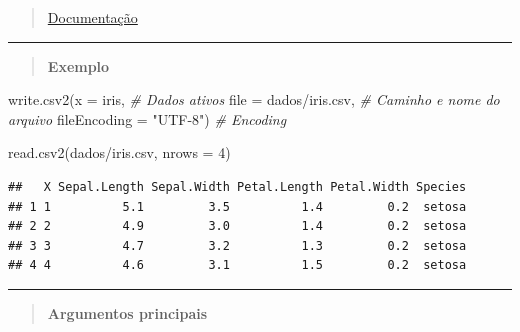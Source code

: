 \documentclass[
]{book}
\newenvironment{Shaded}{\begin{snugshade}}{\end{snugshade}}
\newcommand{\AttributeTok}[1]{\textcolor[rgb]{0.77,0.63,0.00}{#1}}
\newcommand{\CommentTok}[1]{\textcolor[rgb]{0.56,0.35,0.01}{\textit{#1}}}
\newcommand{\DecValTok}[1]{\textcolor[rgb]{0.00,0.00,0.81}{#1}}
\newcommand{\FunctionTok}[1]{\textcolor[rgb]{0.00,0.00,0.00}{#1}}
\newcommand{\NormalTok}[1]{#1}
\newcommand{\StringTok}[1]{\textcolor[rgb]{0.31,0.60,0.02}{#1}}
\theoremstyle{definition}
\theoremstyle{definition}
\theoremstyle{definition}
\theoremstyle{definition}
\theoremstyle{remark}
\begin{document}
\begin{quote}
\href{https://www.rdocumentation.org/packages/utils/versions/3.6.2/topics/write.table}{Documentação}
\end{quote}

\begin{center}\rule{0.5\linewidth}{0.5pt}\end{center}

\begin{quote}
\textbf{Exemplo}
\end{quote}

\begin{Shaded}
\begin{Highlighting}[]
\FunctionTok{write.csv2}\NormalTok{(}\AttributeTok{x =}\NormalTok{ iris,                }\CommentTok{\# Dados ativos}
           \AttributeTok{file =} \StringTok{\textquotesingle{}dados/iris.csv\textquotesingle{}}\NormalTok{, }\CommentTok{\# Caminho e nome do arquivo}
           \AttributeTok{fileEncoding =} \StringTok{"UTF{-}8"}\NormalTok{)  }\CommentTok{\# Encoding}

\FunctionTok{read.csv2}\NormalTok{(}\StringTok{\textquotesingle{}dados/iris.csv\textquotesingle{}}\NormalTok{, }\AttributeTok{nrows =} \DecValTok{4}\NormalTok{)}
\end{Highlighting}
\end{Shaded}

\begin{verbatim}
##   X Sepal.Length Sepal.Width Petal.Length Petal.Width Species
## 1 1          5.1         3.5          1.4         0.2  setosa
## 2 2          4.9         3.0          1.4         0.2  setosa
## 3 3          4.7         3.2          1.3         0.2  setosa
## 4 4          4.6         3.1          1.5         0.2  setosa
\end{verbatim}

\begin{center}\rule{0.5\linewidth}{0.5pt}\end{center}

\begin{quote}
\textbf{Argumentos principais}
\end{quote}
\end{document}
